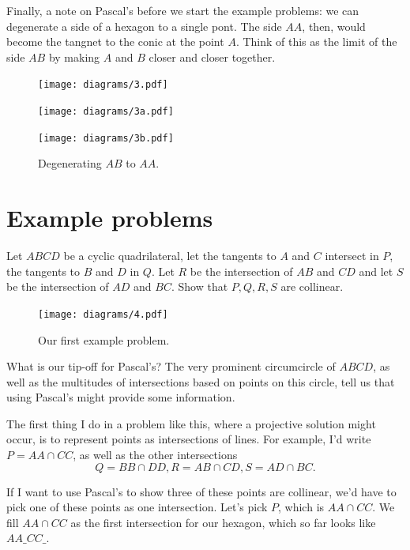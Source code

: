 \documentclass[11pt,paper=letter]{scrartcl}
\begin{document}
Finally, a note on Pascal's before we start the example problems: we can degenerate a side of a hexagon to a single pont. The side $AA$, then, would become the tangnet to the conic at the point $A$. Think of this as the limit of the side $AB$ by making $A$ and $B$ closer and closer together.

\begin{figure}
  \centering
    \begin{minipage}{0.25\textwidth}
    \centering
    \texttt{[image: diagrams/3.pdf]}
    \end{minipage}
    \begin{minipage}{0.3\textwidth}
    \centering
    \texttt{[image: diagrams/3a.pdf]}
    \end{minipage}
    \begin{minipage}{0.3\textwidth}
    \centering
    \texttt{[image: diagrams/3b.pdf]}
    \end{minipage}
  \caption{Degenerating $AB$ to $AA$.}
\end{figure}

\section{Example problems}

\begin{problem}
  Let $ABCD$ be a cyclic quadrilateral, let the tangents to $A$ and $C$ intersect in $P$, the tangents to $B$ and $D$ in $Q$. Let $R$ be the intersection of $AB$ and $CD$ and let $S$ be the intersection of $AD$ and $BC$. Show that $P,Q,R,S$ are collinear.
\end{problem}

\begin{figure}
\centering
    \texttt{[image: diagrams/4.pdf]}
\caption{Our first example problem.}
\end{figure}

What is our tip-off for Pascal's? The very prominent circumcircle of $ABCD$, as well as the multitudes of intersections based on points on this circle, tell us that using Pascal's might provide some information.

The first thing I do in a problem like this, where a projective solution might occur, is to represent points as intersections of lines. For example, I'd write $P = AA \cap CC$, as well as the other intersections $$Q = BB \cap DD, R = AB \cap CD, S = AD \cap BC.$$

If I want to use Pascal's to show three of these points are collinear, we'd have to pick one of these points as one intersection. Let's pick $P$, which is $AA \cap CC$. We fill $AA \cap CC$ as the first intersection for our hexagon, which so far looks like $AA\_CC\_$.
\end{document}
